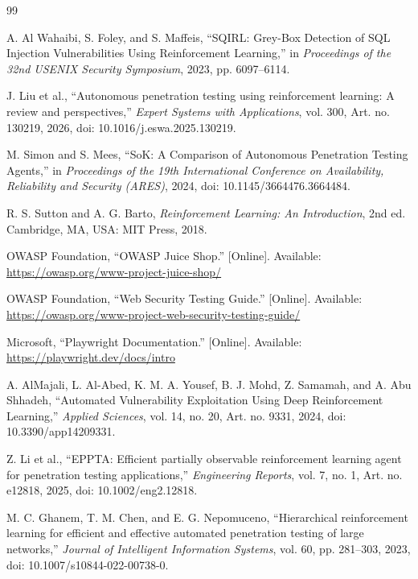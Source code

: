 \documentclass[conference, a4paper]{IEEEtran}
\begin{document}
\begingroup
\small
\begin{thebibliography}{99}

A. Al Wahaibi, S. Foley, and S. Maffeis,
``SQIRL: Grey-Box Detection of SQL Injection Vulnerabilities
Using Reinforcement Learning,''
in \textit{Proceedings of the 32nd USENIX Security Symposium},
2023, pp. 6097--6114.

J. Liu et al.,
``Autonomous penetration testing using reinforcement learning:
A review and perspectives,''
\textit{Expert Systems with Applications},
vol. 300, Art. no. 130219, 2026,
doi: 10.1016/j.eswa.2025.130219.

M. Simon and S. Mees,
``SoK: A Comparison of Autonomous Penetration Testing Agents,''
in \textit{Proceedings of the 19th International Conference on
Availability, Reliability and Security (ARES)}, 2024,
doi: 10.1145/3664476.3664484.

R. S. Sutton and A. G. Barto,
\textit{Reinforcement Learning: An Introduction},
2nd ed. Cambridge, MA, USA: MIT Press, 2018.

OWASP Foundation,
``OWASP Juice Shop.''
[Online]. Available:
\url{https://owasp.org/www-project-juice-shop/}

OWASP Foundation,
``Web Security Testing Guide.''
[Online]. Available:
\url{https://owasp.org/www-project-web-security-testing-guide/}

Microsoft,
``Playwright Documentation.''
[Online]. Available:
\url{https://playwright.dev/docs/intro}

A. AlMajali, L. Al-Abed, K. M. A. Yousef,
B. J. Mohd, Z. Samamah, and A. Abu Shhadeh,
``Automated Vulnerability Exploitation Using Deep Reinforcement
Learning,''
\textit{Applied Sciences},
vol. 14, no. 20, Art. no. 9331, 2024,
doi: 10.3390/app14209331.

Z. Li et al.,
``EPPTA: Efficient partially observable reinforcement learning
agent for penetration testing applications,''
\textit{Engineering Reports},
vol. 7, no. 1, Art. no. e12818, 2025,
doi: 10.1002/eng2.12818.

M. C. Ghanem, T. M. Chen, and E. G. Nepomuceno,
``Hierarchical reinforcement learning for efficient and effective
automated penetration testing of large networks,''
\textit{Journal of Intelligent Information Systems},
vol. 60, pp. 281--303, 2023,
doi: 10.1007/s10844-022-00738-0.

\end{thebibliography}
\endgroup
\end{document}

